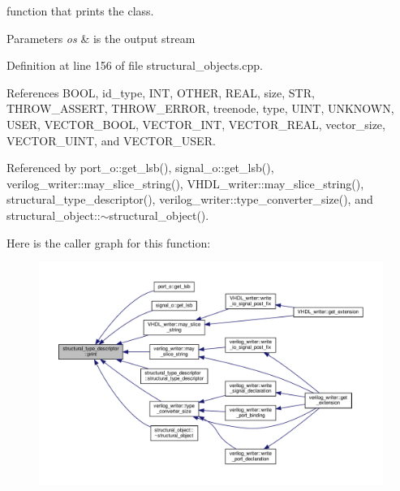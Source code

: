 function that prints the class. 


\begin{DoxyParams}{Parameters}
{\em os} & is the output stream \\
\hline
\end{DoxyParams}


Definition at line 156 of file structural\+\_\+objects.\+cpp.



References B\+O\+OL, id\+\_\+type, I\+NT, O\+T\+H\+ER, R\+E\+AL, size, S\+TR, T\+H\+R\+O\+W\+\_\+\+A\+S\+S\+E\+RT, T\+H\+R\+O\+W\+\_\+\+E\+R\+R\+OR, treenode, type, U\+I\+NT, U\+N\+K\+N\+O\+WN, U\+S\+ER, V\+E\+C\+T\+O\+R\+\_\+\+B\+O\+OL, V\+E\+C\+T\+O\+R\+\_\+\+I\+NT, V\+E\+C\+T\+O\+R\+\_\+\+R\+E\+AL, vector\+\_\+size, V\+E\+C\+T\+O\+R\+\_\+\+U\+I\+NT, and V\+E\+C\+T\+O\+R\+\_\+\+U\+S\+ER.



Referenced by port\+\_\+o\+::get\+\_\+lsb(), signal\+\_\+o\+::get\+\_\+lsb(), verilog\+\_\+writer\+::may\+\_\+slice\+\_\+string(), V\+H\+D\+L\+\_\+writer\+::may\+\_\+slice\+\_\+string(), structural\+\_\+type\+\_\+descriptor(), verilog\+\_\+writer\+::type\+\_\+converter\+\_\+size(), and structural\+\_\+object\+::$\sim$structural\+\_\+object().

Here is the caller graph for this function\+:
\nopagebreak
\begin{figure}[H]
\begin{center}
\leavevmode
\includegraphics[width=350pt]{dc/da4/structstructural__type__descriptor_a90759017b6c040dd29d2cdf02e89416c_icgraph}
\end{center}
\end{figure}
\mbox{\label{structstructural__type__descriptor_aa884cd403a3f82933f4969e0250cc5ff}} 
